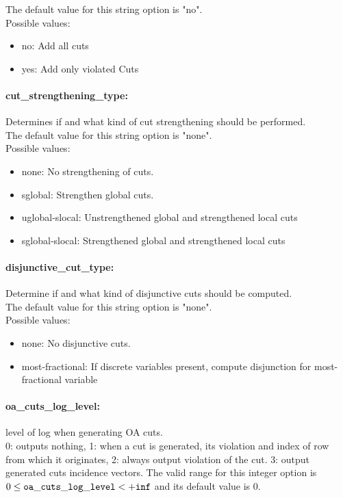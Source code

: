 The default value for this string option is "no".
\\ 
Possible values:
\begin{itemize}
   \item no: Add all cuts
   \item yes: Add only violated Cuts
\end{itemize}

\paragraph{cut\_strengthening\_type:} Determines if and what kind of cut strengthening should be performed. $\;$ \\

The default value for this string option is "none".
\\ 
Possible values:
\begin{itemize}
   \item none: No strengthening of cuts.
   \item sglobal: Strengthen global cuts.
   \item uglobal-slocal: Unstrengthened global and strengthened local
cuts
   \item sglobal-slocal: Strengthened global and strengthened local cuts
\end{itemize}

\paragraph{disjunctive\_cut\_type:} Determine if and what kind of disjunctive cuts should be computed. $\;$ \\

The default value for this string option is "none".
\\ 
Possible values:
\begin{itemize}
   \item none: No disjunctive cuts.
   \item most-fractional: If discrete variables present, compute
disjunction for most-fractional variable
\end{itemize}

\paragraph{oa\_cuts\_log\_level:} level of log when generating OA cuts. $\;$ \\
 0: outputs nothing,
1: when a cut is generated,
its violation and index of row from which it
originates,
2: always output violation of the
cut.
3: output generated cuts incidence vectors. The valid range for this integer option is
$0 \le {\tt oa\_cuts\_log\_level } <  {\tt +inf}$
and its default value is $0$.


